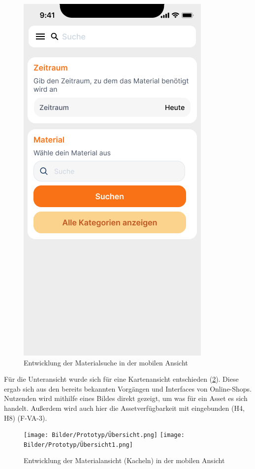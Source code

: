 \begin{figure}[h]
    \includegraphics[scale=0.4]{Bilder/Prototyp/Neu/Suche V2.png}
    \caption{Entwicklung der Materialsuche in der mobilen Ansicht}
    \label{fig:p1}
\end{figure}

Für die Unteransicht wurde sich für eine Kartenansicht entschieden
(\ref{fig:ubersicht}). Diese ergab sich aus den bereits bekannten Vorgängen und
Interfaces von Online-Shops. Nutzenden wird mithilfe eines Bildes direkt
gezeigt, um was für ein Asset es sich handelt. Außerdem wird auch hier die
Assetverfügbarkeit mit eingebunden (H4, H8) (F-VA-3).

\begin{figure}[h]
    \centering
    \texttt{[image: Bilder/Prototyp/Übersicht.png]}\hspace{2em}
    \texttt{[image: Bilder/Prototyp/Übersicht1.png]}
    \caption{Entwicklung der Materialansicht (Kacheln) in der mobilen Ansicht}
    \label{fig:ubersicht}
\end{figure}

